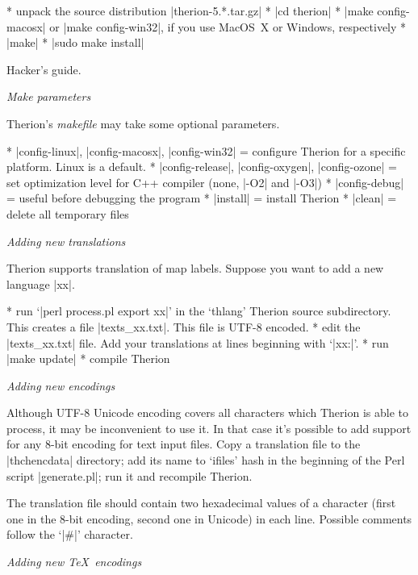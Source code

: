 \list
* unpack the source distribution |therion-5.*.tar.gz|
* |cd therion|
* |make config-macosx| or |make config-win32|, if you use MacOS~X or Windows, 
  respectively
* |make|
* |sudo make install|
\endlist

%

\subsubchapter Hacker's guide.

{\it Make parameters}

Therion's {\it makefile} may take some optional parameters.

\list
* |config-linux|, |config-macosx|, |config-win32| = configure Therion for a 
  specific platform. Linux is a default.
* |config-release|, |config-oxygen|, |config-ozone| = set optimization level 
  for C++ compiler (none, |-O2| and |-O3|)  
* |config-debug| = useful before debugging the program  
* |install| = install Therion
* |clean| = delete all temporary files
\endlist

{\it Adding new translations}

Therion supports translation of map labels. 
Suppose you want to add a new language |xx|. 

\list
* run `|perl process.pl export xx|' in the `thlang' Therion source subdirectory. 
  This creates a file |texts_xx.txt|. This file is UTF-8 encoded.
* edit the |texts_xx.txt| file. Add your translations at lines beginning with
  `|xx:|'.
* run |make update|
* compile Therion
\endlist


{\it Adding new encodings}

Although UTF-8 Unicode encoding covers all characters which Therion is able to 
process, it may be inconvenient to use it. In that case it's possible to add 
support for any 8-bit encoding for text input files. Copy a translation file to 
the |thchencdata| directory; add its name to `ifiles' hash in the beginning of 
the Perl script |generate.pl|; run it and recompile Therion.

The translation file should contain two hexadecimal values of a character 
(first one in the 8-bit encoding, second one in Unicode) in each line. Possible 
comments follow the `|#|' character. 

{\it Adding new \TeX\ encodings}

